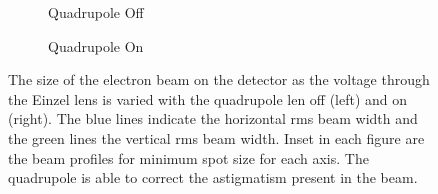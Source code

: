 \begin{figure}
    \centering
    \begin{subfigure}{0.49\linewidth}
    \centering
    
    \caption{Quadrupole Off}
    \label{figure:quadrupole_scans_off}
    \end{subfigure}
    \begin{subfigure}{0.49\linewidth}
    \centering
    
    \caption{Quadrupole On}
    \label{figure:quadrupole_scans_on}
    \end{subfigure}
    \caption{The size of the electron beam on the detector as the voltage through the Einzel lens is varied with the quadrupole len off (left) and on (right). The blue lines indicate the horizontal \gls{rms} beam width and the green lines the vertical \gls{rms} beam width. Inset in each figure are the beam profiles for minimum spot size for each axis. The quadrupole is able to correct the astigmatism present in the beam.}
    \label{figure:quadrupole_scans}
\end{figure}
